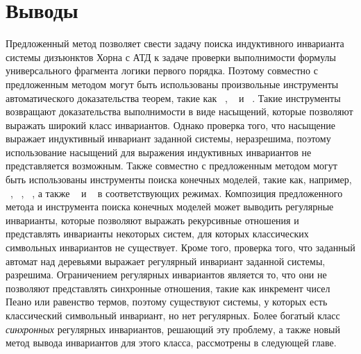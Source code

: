\section{Выводы}\label{sec:fmf/conclusion}
Предложенный метод позволяет свести задачу поиска индуктивного инварианта системы дизъюнктов Хорна с АТД к задаче проверки выполнимости формулы универсального фрагмента логики первого порядка.
Поэтому совместно с предложенным методом могут быть использованы произвольные инструменты автоматического доказательства теорем, такие как \vampire{}~\cite{kovacs2013first}, \eprover{}~\cite{10.5555/1218615.1218621} и \zipperposition{}~\cite{10.1007/978-3-319-66167-4_10}.
Такие инструменты возвращают доказательства выполнимости в виде насыщений, которые позволяют выражать широкий класс инвариантов. Однако проверка того, что насыщение выражает индуктивный инвариант заданной системы, неразрешима, поэтому использование насыщений для выражения индуктивных инвариантов не представляется возможным.
Также совместно с предложенным методом могут быть использованы инструменты поиска конечных моделей, такие как, например, \mace{}~\cite{https://doi.org/10.48550/arxiv.cs/0310055}, \kodkod{}~\cite{10.1007/978-3-540-71209-1_49}, \paradox{}~\cite{claessen2003new}, а также \cvc{}~\cite{reynolds2013finite} и \vampire{}~\cite{10.1007/978-3-319-40970-2_20} в соответствующих режимах. Композиция предложенного метода и инструмента поиска конечных моделей может выводить регулярные инварианты, которые позволяют выражать рекурсивные отношения и представлять инварианты некоторых систем, для которых классических символьных инвариантов не существует. Кроме того, проверка того, что заданный автомат над деревьями выражает регулярный инвариант заданной системы, разрешима.
Ограничением регулярных инвариантов является то, что они не позволяют представлять синхронные отношения, такие как инкремент чисел Пеано или равенство термов, поэтому существуют системы, у которых есть классический символьный инвариант, но нет регулярных.
Более богатый класс \emph{синхронных} регулярных инвариантов, решающий эту проблему, а также новый метод вывода инвариантов для этого класса, рассмотрены в следующей главе.
